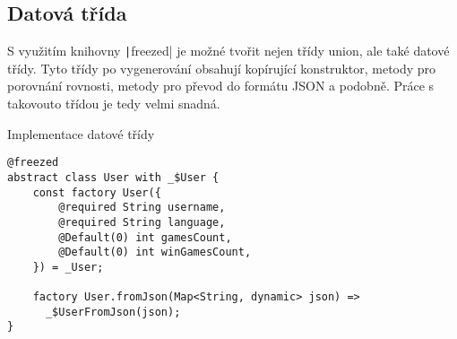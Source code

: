 \subsection{Datová třída}

S využitím knihovny \texttt|freezed| je možné tvořit nejen
třídy union,
ale také datové třídy.
Tyto třídy po vygenerování obsahují kopírující konstruktor,
metody pro porovnání rovnosti,
metody pro převod do formátu JSON a podobně.
Práce s takovouto třídou je tedy velmi snadná.

\begin{listing}
    \caption{Implementace datové třídy}
    \label{code:implementation-2}
    \begin{verbatim}
@freezed
abstract class User with _$User {
    const factory User({
        @required String username,
        @required String language,
        @Default(0) int gamesCount,
        @Default(0) int winGamesCount,
    }) = _User;

    factory User.fromJson(Map<String, dynamic> json) =>
      _$UserFromJson(json);
}
    \end{verbatim}
\end{listing}

